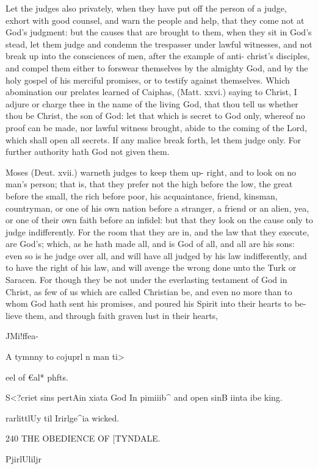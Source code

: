 \documentclass{custom}
\begin{document}
{Let the judges also privately, when they have put off 
the person of a judge, exhort with good counsel, and 
warn the people and help, that they come not at God's 
judgment: but the causes that are brought to them, 
when they sit in God's stead, let them judge and condemn 
the trespasser under lawful witnesses, and not break up 
into the consciences of men, after the example of anti- 
christ's disciples, and compel them either to forswear 
themselves by the almighty God, and by the holy gospel 
of his merciful promises, or to testify against themselves. 
Which abomination our prelates learned of Caiphas, 
(Matt. xxvi.) saying to Christ, I adjure or charge thee in 
the name of the living God, that thou tell us whether 
thou be Christ, the son of God: let that which is secret 
to God only, whereof no proof can be made, nor 
lawful witness brought, abide to the coming of the 
Lord, which shall open all secrets. If any malice break 
forth, let them judge only. For further authority hath 
God not given them. 

Moses (Deut. xvii.) warneth judges to keep them up- 
right, and to look on no man's person; that is, that they 
prefer not the high before the low, the great before the 
small, the rich before poor, his acquaintance, friend, 
kinsman, countryman, or one of his own nation before 
a stranger, a friend or an alien, yea, or one of their own 
faith before an infidel: but that they look on the cause 
only to judge indifferently. For the room that they are 
in, and the law that they execute, are God's; which, as 
he hath made all, and is God of all, and all are his sons: 
even so is he judge over all, and will have all judged by 
his law indifferently, and to have the right of his law, and 
will avenge the wrong done unto the Turk or Saracen. 
For though they be not under the everlasting testament of 
God in Christ, as few of us which are called Christian 
be, and even no more than to whom God hath sent his 
promises, and poured his Spirit into their hearts to be- 
lieve them, and through faith graven lust in their hearts, 

JMi!ffea- 

A tymnny 
to cojuprl 
n man ti> 

eel of €al* 
phfts. 

S<?criet sins 
pertAin 
xiata God 
In pimiiib^ 
and open 
sinB iinta 
ibe king. 

rarlittlUy 
til Irirlge^ia 
wicked. 


240
THE OBEDIENCE OF
[TYNDALE.

PjirlUliljr 

}
\end{document}

